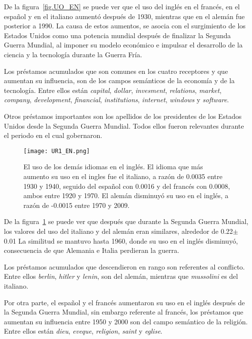 De la figura~\ref{fig.UO_EN} se puede ver que el uso del inglés en el francés, en el español y en el italiano aumentó después de 1930, mientras que en el alemán fue posterior a 1990.  La causa de estos aumentos, se asocia con el surgimiento de los Estados Unidos como una potencia mundial después de finalizar la Segunda Guerra Mundial,  al  imponer  su modelo económico e impulsar el desarrollo de la ciencia y la tecnología durante la Guerra Fría.

Los préstamos acumulados que son comunes en los cuatro receptores y que aumentan su influencia, son de los campos semánticos de la economía y de la tecnología. Entre ellos están \textit{capital}, \textit{dollar}, \textit{invesment}, \textit{relations}, \textit{market}, \textit{company}, \textit{development}, \textit{financial},  \textit{institutions}, \textit{internet}, \textit{windows} y \textit{software}. 
\label{EN-D}

Otros préstamos importantes son los apellidos de los presidentes de los Estados Unidos desde la Segunda Guerra Mundial. Todos ellos fueron relevantes durante el periodo en el cual gobernaron. 


\begin{figure}[h!]
	\centering
	\texttt{[image: UR1\_EN.png]}
	\caption{El uso de los demás idiomas en el inglés. El idioma que más aumento su uso en el ingles fue el italiano, a razón de 0.0035 entre 1930 y 1940, seguido del español con 0.0016 y del francés con 0.0008, ambos entre 1920 y 1970. El alemán disminuyó su uso en el inglés, a razón de -0.0015 entre 1970 y 2009.}
	\label{fig.UR_EN}
\end{figure} 


De la figura~\ref{fig.UR_EN} se puede ver que después que durante la Segunda Guerra Mundial, los valores del uso del italiano y del alemán eran similares, alrededor de 0.22$\pm$0.01 La similitud se mantuvo hasta 1960, donde su uso en el inglés disminuyó, consecuencia de que Alemania e Italia perdieran la guerra.

Los préstamos acumulados que descendieron en rango son referentes al conflicto. Entre ellos \textit{berlin}, \textit{hitler} y \textit{lenin}, son del alemán,  mientras que \textit{mussolini} es del italiano. 

Por otra parte, el español y el francés aumentaron su uso en el inglés después de la Segunda Guerra Mundial, sin embargo  referente al francés, los préstamos que aumentan su influencia entre 1950 y 2000 son del campo semántico de la religión. Entre ellos están \textit{dieu}, \textit{eveque}, \textit{religion}, \textit{saint} y \textit{eglise}.

